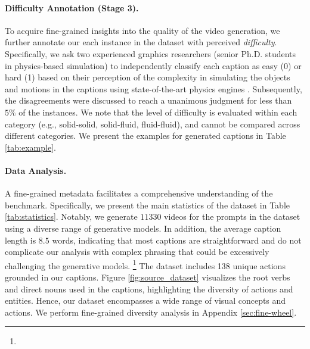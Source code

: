 \paragraph{Difficulty Annotation (Stage 3).} To acquire fine-grained insights into the quality of the video generation, we further annotate our each instance in the dataset with perceived \textit{difficulty}. Specifically, we ask two experienced graphics researchers (senior Ph.D. students in physics-based simulation) to independently classify each caption as easy (0) or hard (1) based on their perception of the complexity in simulating the objects and motions in the captions using state-of-the-art physics engines \cite{li2020incremental, chen2023multi, xie2023contact, zong2023neural, qu2023power, fang2020iq}. Subsequently, the disagreements were discussed to reach a unanimous judgment for less than $5\%$ of the instances.
We note that the level of difficulty is evaluated within each category (e.g., solid-solid, solid-fluid, fluid-fluid), and cannot be compared across different categories. We present the examples for generated captions in Table \ref{tab:example}.





\paragraph{Data Analysis.} A fine-grained metadata facilitates a comprehensive understanding of the benchmark. Specifically, we present the main statistics of the \name{} dataset in Table \ref{tab:statistics}. Notably, we generate $11330$ videos for the prompts in the dataset using a diverse range of generative models. In addition, the average caption length is $8.5$ words, indicating that most captions are straightforward and do not complicate our analysis with complex phrasing that could be excessively challenging the generative models. \footnote{} The dataset includes 138 unique actions grounded in our captions. Figure \ref{fig:source_dataset} visualizes the root verbs and direct nouns used in the \name{} captions, highlighting the diversity of actions and entities. Hence, our dataset encompasses a wide range of visual concepts and actions. We perform fine-grained diversity analysis in Appendix \ref{sec:fine-wheel}.
